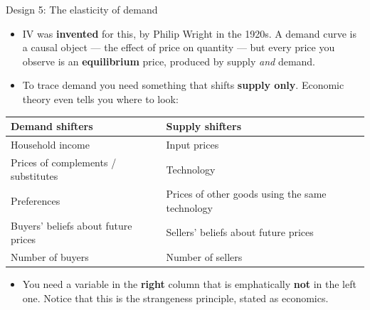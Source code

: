 \documentclass[
  11pt,
  ignorenonframetext,
  aspectratio=169,
]{beamer}
\providecommand{\tightlist}{%
  \setlength{\itemsep}{0pt}\setlength{\parskip}{0pt}}
\begin{document}
\begin{frame}{Design 5: The elasticity of demand}
\protect{}\label{design-5-the-elasticity-of-demand}
\begin{itemize}
\tightlist
\item
  IV was \textbf{invented} for this, by Philip Wright in the 1920s. A
  demand curve is a causal object --- the effect of price on quantity
  --- but every price you observe is an \textbf{equilibrium} price,
  produced by supply \emph{and} demand.
\item
  To trace demand you need something that shifts \textbf{supply only}.
  Economic theory even tells you where to look:
\end{itemize}

\begin{center}
\small
\begin{tabular}{ll}
\toprule
Demand shifters & Supply shifters \\
\midrule
Household income & Input prices \\
Prices of complements / substitutes & Technology \\
Preferences & Prices of other goods using the same technology \\
Buyers' beliefs about future prices & Sellers' beliefs about future prices \\
Number of buyers & Number of sellers \\
\bottomrule
\end{tabular}
\end{center}

\begin{itemize}
\tightlist
\item
  You need a variable in the \textbf{right} column that is emphatically
  \textbf{not} in the left one. Notice that this is the strangeness
  principle, stated as economics.
\end{itemize}
\end{frame}
\end{document}
